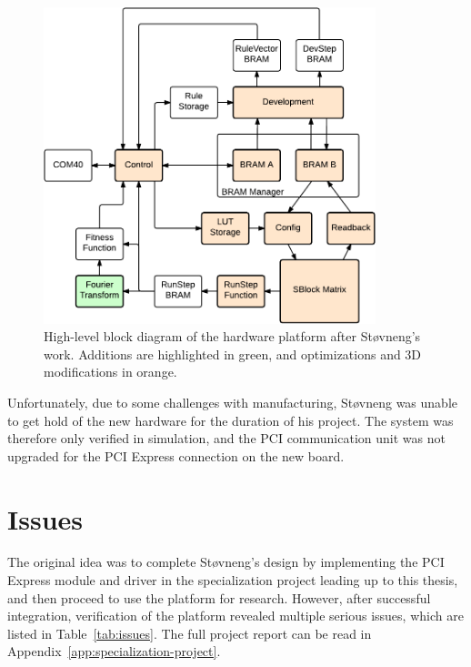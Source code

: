 \begin{figure}[!ht]
    \centering
    \includegraphics[width=0.86\textwidth]{figures/overview-stovneng}
    \caption[Støvneng's hardware design]{
        High-level block diagram of the hardware platform after Støvneng's work.
        Additions are highlighted in green, and optimizations and 3D modifications in orange.
    }
    \label{fig:overview-stovneng}
\end{figure}

Unfortunately, due to some challenges with manufacturing, Støvneng was unable to get hold of the new hardware for the duration of his project.
The system was therefore only verified in simulation, and the PCI communication unit was not upgraded for the PCI Express connection on the new board.


\section{Issues}


The original idea was to complete Støvneng's design by implementing the PCI Express module and driver in the specialization project leading up to this thesis, and then proceed to use the platform for research.
However, after successful integration, verification of the platform revealed multiple serious issues, which are listed in Table~\ref{tab:issues}.
The full project report can be read in Appendix~\ref{app:specialization-project}.

